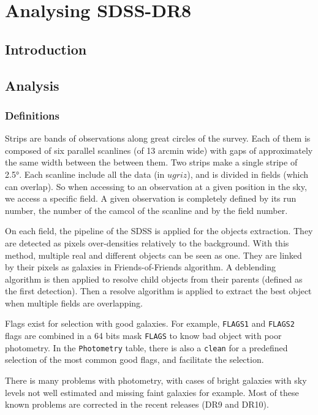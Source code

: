 \chapter{Analysing SDSS-DR8}
\label{ap:sdss}
\minitoc%
%
\section{Introduction}
%
%
\section{Analysis}
%
\subsection{Definitions}
%
Strips are bands of observations along great circles of the survey. Each of
them is composed of six parallel scanlines (of 13 arcmin wide) with gaps of
approximately the same width between the between them. Two strips make a
single stripe of 2.5°. Each scanline include all the data (in $ugriz$), and
is divided in fields (which can overlap). So when accessing to an
observation at a given position in the sky, we access a specific field. A
given observation is completely defined by its run number, the number of the
camcol of the scanline and by the field number.

On each field, the pipeline of the SDSS is applied for the objects
extraction. They are detected as pixels over-densities relatively to the
background. With this method, multiple real and different objects can be
seen as one. They are linked by their pixels as galaxies in
Friends-of-Friends algorithm. A deblending algorithm is then applied to
resolve child objects from their parents (defined as the first detection).
Then a resolve algorithm is applied to extract the best object when multiple
fields are overlapping.

Flags exist for selection with good galaxies. For example, \texttt{FLAGS1}
and \texttt{FLAGS2} flags are combined in a 64 bits mask \texttt{FLAGS} to
know bad object with poor photometry. In the \texttt{Photometry} table,
there is also a \texttt{clean} for a predefined selection of the most common
good flags, and facilitate the selection.

There is many problems with photometry, with cases of bright galaxies with
sky levels not well estimated and missing faint galaxies for example. Most
of these known problems are corrected in the recent releases (DR9 and DR10).

